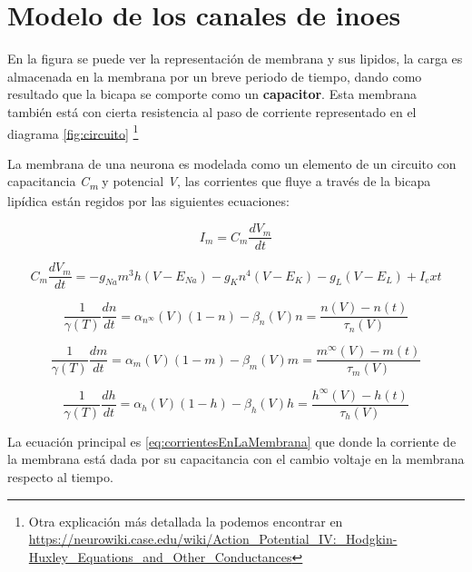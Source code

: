 \section{Modelo de los canales de inoes}

En la figura  se puede ver la representación de membrana y sus lipidos, la carga es almacenada en la membrana por un breve periodo de tiempo, dando como resultado que la bicapa se comporte como un \textbf{capacitor}. Esta membrana también está con cierta resistencia al paso de corriente representado en el diagrama \ref{fig:circuito} \footnote{Otra explicación más detallada la podemos encontrar en \url{https://neurowiki.case.edu/wiki/Action_Potential_IV:_Hodgkin-Huxley_Equations_and_Other_Conductances}} 

La membrana de una neurona es modelada como un elemento de un circuito con capacitancia \emph{C\textsubscript{m}} y potencial \emph{V}, las corrientes que fluye a través de la bicapa lipídica están regidos por las siguientes ecuaciones:

\begin{equation}
  I_{m} = C_{m} \dfrac{dV_{m}}{dt}
  \label{eq:corrientesEnLaMembrana}
\end{equation}


\begin{equation}
  C_{m} \dfrac{dV_{m}}{dt} =  - g_{Na} m^3 h(V - E_{Na} ) - g_{K} n^4 (V - E_{K} ) - g_{L} (V - E_{L} ) + I_ext
  \label{eq:corrientesEnLaMembrana2}
\end{equation}

\begin{equation}
  \dfrac{1}{\gamma(T)}\dfrac{dn}{dt} =  \alpha_{n^\infty} (V)(1 - n) - \beta_{n} (V) n = \dfrac{n(V)-n(t)}{\tau_{n}(V)}
  \label{eq:corrientesEnLaMembrana3}
\end{equation}

\begin{equation}
  \dfrac{1}{\gamma(T)}\dfrac{dm}{dt} =  \alpha_{m} (V)(1 - m) - \beta_{m} (V) m = \dfrac{m^\infty(V)-m(t)}{\tau_{m}(V)}
  \label{eq:corrientesEnLaMembrana4}
\end{equation}

\begin{equation}
  \dfrac{1}{\gamma(T)}\dfrac{dh}{dt} =  \alpha_{h} (V)(1 - h) - \beta_{h} (V) h = \dfrac{h^\infty(V)-h(t)}{\tau_{h}(V)}
  \label{eq:corrientesEnLaMembrana5}
\end{equation}

La ecuación principal es \ref{eq:corrientesEnLaMembrana} que donde la corriente de la membrana está dada por su capacitancia con el cambio voltaje en la membrana respecto al tiempo.


